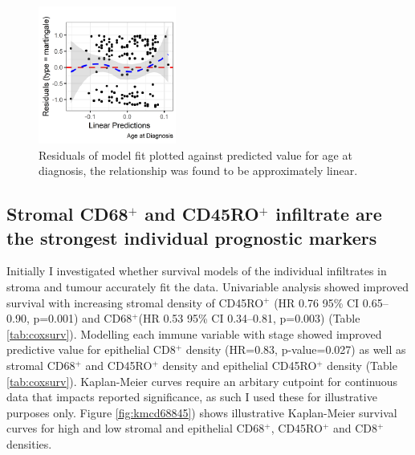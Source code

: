 \begin{figure}
    \centering
    \includegraphics[width=\textwidth]{Chapter2/Figs/Raster/Artboard 39.png}
    \caption[Residuals of model fit]{Residuals of model fit plotted against predicted value for age at diagnosis, the relationship was found to be approximately linear.}
    \label{fig:model_age}
\end{figure}



\subsection[Prognostic value of individual infiltrates]{Stromal CD68$^+$ and CD45RO$^+$ infiltrate are the strongest individual prognostic markers}

Initially I investigated whether survival models of the individual infiltrates in stroma and tumour accurately fit the data. Univariable analysis showed improved survival with increasing stromal density of CD45RO$^+$ (HR 0.76 95\% CI 0.65–0.90, p=0.001) and CD68$^+$(HR 0.53 95\% CI 0.34–0.81, p=0.003) (Table \ref{tab:coxsurv}). Modelling each immune variable with stage showed improved predictive value for epithelial CD8$^+$ density (HR=0.83, p-value=0.027) as well as stromal CD68$^+$ and CD45RO$^+$ density and epithelial CD45RO$^+$ density (Table  \ref{tab:coxsurv}). Kaplan-Meier curves require an arbitary cutpoint for continuous data that impacts reported significance, as such I used these for illustrative purposes only. Figure \ref{fig:kmcd68845}) shows illustrative Kaplan-Meier survival curves for high and low stromal and epithelial CD68$^+$, CD45RO$^+$ and CD8$^+$ densities.\\



